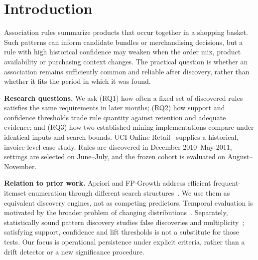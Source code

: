 \begin{abstract}
Frequent co-purchases describe historical baskets, but their persistence in later transactions is an empirical question. We study this gap using UCI Online Retail with separate discovery, validation and test periods. A validation-selected cohort of \SelectedRules{} rules achieves \MeanRetention{} mean monthly retention in four held-out months; \AllMonthsRules{} rules satisfy every monthly requirement throughout. The interpretation depends on observability: low-support cohorts frequently lack adequate monthly evidence, while restricting evaluation to orders with recorded customer IDs lowers retention to \KnownRetention{}. Identical bounded Apriori and FP-Growth searches return the same itemsets and support counts at modest local computational cost. The study contributes an auditable temporal evaluation and diagnoses how thresholds, observation coverage and order composition affect apparent stability. It does not establish causal retail utility or statistical significance of individual rules.
\end{abstract}

\section{Introduction}
Association rules summarize products that occur together in a shopping basket. Such patterns can inform candidate bundles or merchandising decisions, but a rule with high historical confidence may weaken when the order mix, product availability or purchasing context changes. The practical question is whether an association remains sufficiently common and reliable after discovery, rather than whether it fits the period in which it was found.

\textbf{Research questions.} We ask (RQ1) how often a fixed set of discovered rules satisfies the same requirements in later months; (RQ2) how support and confidence thresholds trade rule quantity against retention and adequate evidence; and (RQ3) how two established mining implementations compare under identical inputs and search bounds. UCI Online Retail~\citep{chen2015} supplies a historical, invoice-level case study. Rules are discovered in December 2010--May 2011, settings are selected on June--July, and the frozen cohort is evaluated on August--November.

\textbf{Relation to prior work.} Apriori and FP-Growth address efficient frequent-itemset enumeration through different search structures~\citep{agrawal1994,han2000}. We use them as equivalent discovery engines, not as competing predictors. Temporal evaluation is motivated by the broader problem of changing distributions~\citep{gama2014}. Separately, statistically sound pattern discovery studies false discoveries and multiplicity~\citep{hamalainen2019}; satisfying support, confidence and lift thresholds is not a substitute for those tests. Our focus is operational persistence under explicit criteria, rather than a drift detector or a new significance procedure.


